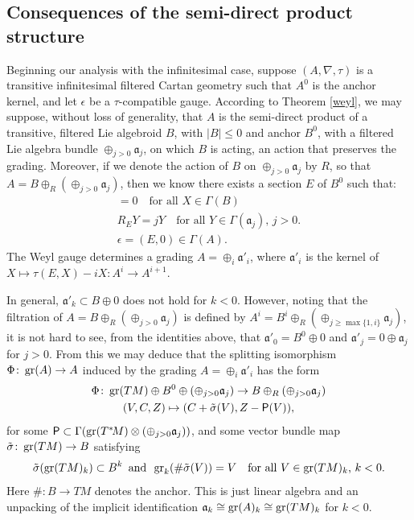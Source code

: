 \documentclass[leqno,12pt]{amsart} %
\begin{document}
\subsection{Consequences of the semi-direct product structure}\label{consequences}%
Beginning our analysis with the infinitesimal case, suppose $(A, \nabla, \tau)$ is a
transitive infinitesimal filtered Cartan geometry such that $A^0$ is the anchor kernel, and let
$\epsilon $ be a $\tau$-compatible gauge. According to Theorem \ref{weyl}, we may suppose,
without loss of generality, that $A$ is the semi-direct product of a transitive, filtered
Lie algebroid $B$, with $|B| \le 0$ and anchor $B^0$, with a filtered Lie algebra bundle
$\oplus_{j>0}{\mathfrak a}_j$, on which $B $ is acting, an action that preserves the
grading. Moreover, if we denote the action of $B$ on $\oplus_{j>0}{\mathfrak a}_j$ by $R$,
so that $A = B \oplus_R(\oplus_{j>0}{\mathfrak a}_j)$, then we know there exists a section
$E$ of $B^0$ such that:
\begin{gather*}
  [E, X]=0\quad \text{for all $X \in \Gamma(B)$}\\
  R_EY = jY\quad\text{for all $Y \in \Gamma({\mathfrak a}_j)$, $j>0$}.\\
  \epsilon = (E, 0) \in \Gamma(A).
\end{gather*}
The Weyl gauge determines a grading $A = \oplus_i {\mathfrak a}'_i$, where
${\mathfrak a}'_i$ is the kernel of
$X \mapsto \tau(E,X) - iX \colon A^i \rightarrow A^{i+1}$.

In general, ${\mathfrak a}'_k \subset B \oplus 0$ does not hold for $k <0$. However,
noting that the filtration of $A=B\oplus_R (\oplus_{j>0}{\mathfrak a}_j)$ is defined by
$A^i = B^i \oplus_R(\oplus_{j\ge\max\{1,i\}}{\mathfrak a}_j)$, it is not hard to see,
from the identities above, that ${\mathfrak a}'_0=B^0 \oplus 0$ and
${\mathfrak a}'_j=0\oplus{\mathfrak a}_j$ for $j> 0$.  From this we may deduce that the
splitting isomorphism $\Phi\colon \operatorname{\operatorname{gr}}(A) \rightarrow A$ induced by the grading
$A = \oplus_i {\mathfrak a}'_i$ has the form
\begin{gather*}
    \Phi \colon \operatorname{\operatorname{gr}}(TM) \oplus B^0 \oplus (\oplus_{j>0} {\mathfrak a}_j)
    \rightarrow B\oplus_R(\oplus_{j>0}{\mathfrak a}_j)\\
    (V, C, Z) \mapsto (C + \tilde \sigma (V), Z - \mathsf{P}(V)),
\end{gather*}
for some $\mathsf{P} \subset \Gamma(\operatorname{\operatorname{gr}}(T^*\!M)\otimes(\oplus_{j>0}{\mathfrak a}_j))$,
and some vector bundle map $\tilde \sigma \colon \operatorname{\operatorname{gr}}(TM) \rightarrow B$ satisfying
\begin{equation*}
  \tilde \sigma(\operatorname{\operatorname{gr}}(TM)_k) \subset B^k\enspace\text{and}\enspace
    \operatorname{\operatorname{gr}}_k(\# \tilde \sigma (V)) = V \quad\text{for all $V \in \operatorname{\operatorname{gr}}(TM)_k$, $k < 0$}.
\end{equation*}
Here $\# \colon B \rightarrow TM$ denotes the anchor. This is just linear algebra and an
unpacking of the implicit identification
${\mathfrak a}_k\cong\operatorname{\operatorname{gr}}(A)_k \cong \operatorname{\operatorname{gr}}(TM)_k$ for $k < 0$.
\end{document}
